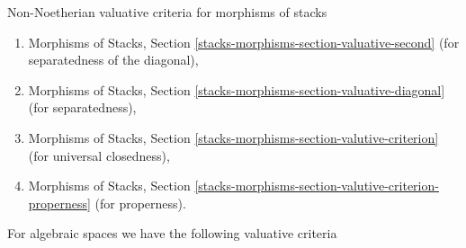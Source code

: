 \noindent
Non-Noetherian valuative criteria for morphisms of stacks
\begin{enumerate}
\item Morphisms of Stacks, Section
\ref{stacks-morphisms-section-valuative-second}
(for separatedness of the diagonal),
\item Morphisms of Stacks, Section
\ref{stacks-morphisms-section-valuative-diagonal}
(for separatedness),
\item Morphisms of Stacks, Section
\ref{stacks-morphisms-section-valutive-criterion}
(for universal closedness),
\item Morphisms of Stacks, Section
\ref{stacks-morphisms-section-valutive-criterion-properness}
(for properness).
\end{enumerate}

\medskip\noindent
For algebraic spaces we have the following valuative criteria
